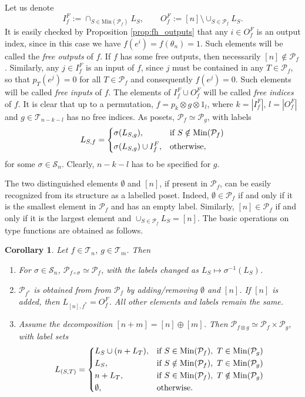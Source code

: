 \documentclass[12pt]{article}
\newtheorem{coro}{Corollary}
\theoremstyle{definition}
\theoremstyle{remark}
\def\Te{\mathcal T}
\def\Pe{\mathcal P}
\def\permut{\mathscr{S}}
\begin{document}
Let us denote
\[
I_f^F:=\cap_{S\in \mathrm{Min}(\Pe_f)} L_S, \qquad O_f^F:=[n]\setminus
\cup_{S\in \Pe_f}L_S.
\]
It is easily checked by Proposition \ref{prop:fh_outputs} that any  $i\in O_f^F$ is an
output index, since in this case  we have
$f(e^i)=f(\theta_n)=1$. Such elements will be called
the {\em free outputs} of $f$. If $f$ has some free outputs, then necessarily $[n]\notin
\Pe_f$. Similarly, any  $j\in I_f^F$ is an input of $f$, since $j$ must be
contained in any $T\in \Pe_f$, so that $p_T(e^j)=0$ for all $T\in \Pe_f$ and consequently
$f(e^j)=0$. Such elements will be called {\em free
inputs} of $f$. The elements of $I_f^F\cup O_f^F$ will be called {\em free indices} of
$f$.  It is clear that up to a permutation, $f=p_k\otimes g\otimes
1_l$, where
$k=|I_f^F|$, $l=|O_f^F|$  and $g\in \Te_{n-k-l}$ has no free indices. As posets,
$\Pe_f\simeq \Pe_g$,  with labels
\[
L_{S,f}=\begin{dcases} \sigma(L_{S,g}), &\text{if } S\notin \mathrm{Min}(\Pe_f)\\
\sigma(L_{S,g})\cup I^F_f, &\text {otherwise},
\end{dcases}
\]
for some $\sigma\in \permut_n$. Clearly, $n-k-l$ has to be specified for $g$. 



The  two distinguished elements $\emptyset$ and $[n]$, if present in $\Pe_f$, can be easily recognized
from its structure as a labelled poset. Indeed, $\emptyset\in \Pe_f$ if and only if it is
the smallest element in $\Pe_f$ and has an empty label. 
Similarly, $[n]\in \Pe_f$ if and
only if it is the largest element and $\cup_{S\in \Pe_f}L_S=[n]$. The basic operations on
type functions are obtained as follows. 

\begin{coro}\label{coro:Pf} Let $f\in \Te_n$, $g\in \Te_m$. Then
\begin{enumerate}
\item[(i)] For $\sigma\in \permut_n$,  $\Pe_{f\circ\sigma}\simeq \Pe_f$, with the labels
changed as $L_S\mapsto \sigma^{-1}(L_S)$.

\item[(ii)] $\Pe_{f^*}$ is obtained from from $\Pe_f$ by adding/removing $\emptyset$ and
$[n]$. If $[n]$ is added, then  $L_{[n],f^*}=O_f^F$.  All other elements and labels remain the same. 
\item[(iii)] Assume the decomposition $[n+m]=[n]\oplus[m]$. Then 
$\Pe_{f\otimes g}\simeq \Pe_f\times \Pe_g$, with label sets
\[
L_{(S,T)}=\begin{dcases} L_S\cup (n+L_T), & \text{if } S\in \mathrm{Min}(\Pe_f),\ T\in
\mathrm{Min}(\Pe_g)\\
L_S, & \text{if } S\notin \mathrm{Min}(\Pe_f),\ T\in
\mathrm{Min}(\Pe_g)\\
n+ L_T, &\text{if }S \in \mathrm{Min}(\Pe_f),\ T\notin
\mathrm{Min}(\Pe_g)\\
\emptyset, & \text{otherwise}.
\end{dcases}
\]



\end{enumerate}


\end{coro}
\end{document}
